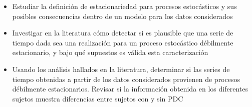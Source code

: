 \begin{itemize}
\item Estudiar la definición de estacionariedad para procesos estocásticos y sus posibles 
consecuencias dentro de un modelo para los datos considerados

\item Investigar en la literatura cómo detectar si es plausible que una serie de tiempo dada sea 
una realización para un proceso estocástico débilmente estacionario, y bajo qué supuestos 
es válida esta caracterización

\item Usando los análisis hallados en la literatura, determinar si las series de tiempo 
obtenidas a partir de los datos considerados provienen de procesos débilmente estacionarios.
Revisar si la información obtenida en los diferentes sujetos muestra diferencias entre sujetos 
con y sin PDC
\end{itemize}

